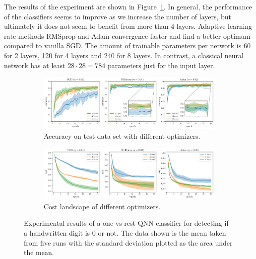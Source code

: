 \documentclass[a4paper,10pt]{article}
\begin{document}
The results of the experiment are shown in Figure~\ref{fig:ovr_results}.
In general, the performance of the classifiers seems to improve as we increase the number of layers, but ultimately it does not seem to benefit from more than 4 layers.
Adaptive learning rate methods RMSprop and Adam convergence faster and find a better optimum compared to vanilla SGD.
The amount of trainable parameters per network is 60 for 2 layers, 120 for 4 layers and 240 for 8 layers.
In contrast, a classical neural network has at least $28 \cdot 28 = 784$ parameters just for the input layer.

\begin{figure}[ht]
	\centering
	\begin{subfigure}{1\textwidth}
		\centering
		\includegraphics[width=1\linewidth]{figures/qnn_ovr_accuracy.pdf}
		\caption{Accuracy on test data set with different optimizers.}
		\vspace*{4mm}
	\end{subfigure}
	\begin{subfigure}{1\textwidth}
		\centering
		\includegraphics[width=1\linewidth]{figures/qnn_ovr_cost.pdf}
		\caption{Cost landscape of different optimizers.}
	\end{subfigure}
	\caption{Experimental results of a one-vs-rest QNN classifier for detecting if a handwritten digit is 0 or not. The data shown is the mean taken from five runs with the standard deviation plotted as the area under the mean.}
	\label{fig:ovr_results}
\end{figure}
\end{document}
